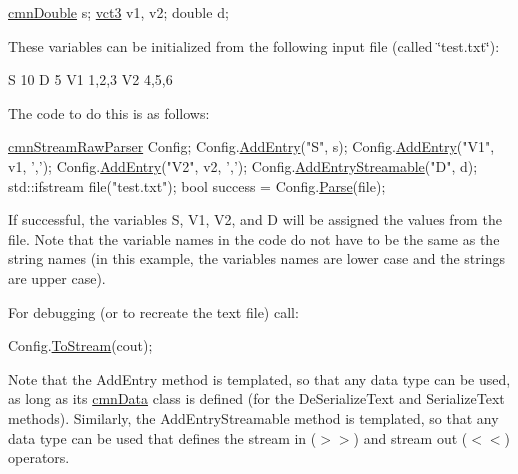 \begin{DoxyCode}
\hyperlink{classcmn_generic_object_proxy}{cmnDouble} s;
\hyperlink{classvct_fixed_size_vector}{vct3} v1, v2;
\textcolor{keywordtype}{double} d;
\end{DoxyCode}


These variables can be initialized from the following input file (called \char`\"{}test.\+txt\char`\"{})\+:


\begin{DoxyCode}
S 10
D 5
V1 1,2,3
V2 4,5,6
\end{DoxyCode}


The code to do this is as follows\+:


\begin{DoxyCode}
\hyperlink{classcmn_stream_raw_parser}{cmnStreamRawParser} Config;
Config.\hyperlink{classcmn_stream_raw_parser_a85682f38234f9f9c9c452240511f52ba}{AddEntry}(\textcolor{stringliteral}{"S"}, s);
Config.\hyperlink{classcmn_stream_raw_parser_a85682f38234f9f9c9c452240511f52ba}{AddEntry}(\textcolor{stringliteral}{"V1"}, v1, \textcolor{charliteral}{','});
Config.\hyperlink{classcmn_stream_raw_parser_a85682f38234f9f9c9c452240511f52ba}{AddEntry}(\textcolor{stringliteral}{"V2"}, v2, \textcolor{charliteral}{','});
Config.\hyperlink{classcmn_stream_raw_parser_a6fd698505c5456edf6659d2eb3c7525c}{AddEntryStreamable}(\textcolor{stringliteral}{"D"}, d);
std::ifstream file(\textcolor{stringliteral}{"test.txt"});
\textcolor{keywordtype}{bool} success = Config.\hyperlink{classcmn_stream_raw_parser_aa414a151c05b00e73c20d1ed13c94d7a}{Parse}(file);
\end{DoxyCode}


If successful, the variables S, V1, V2, and D will be assigned the values from the file. Note that the variable names in the code do not have to be the same as the string names (in this example, the variables names are lower case and the strings are upper case).

For debugging (or to recreate the text file) call\+:


\begin{DoxyCode}
Config.\hyperlink{classcmn_stream_raw_parser_a34cc22ae5fb87be3563dbce530bc6e1d}{ToStream}(cout);
\end{DoxyCode}


Note that the Add\+Entry method is templated, so that any data type can be used, as long as its \hyperlink{classcmn_data}{cmn\+Data} class is defined (for the De\+Serialize\+Text and Serialize\+Text methods). Similarly, the Add\+Entry\+Streamable method is templated, so that any data type can be used that defines the stream in ($>$$>$) and stream out ($<$$<$) operators.

